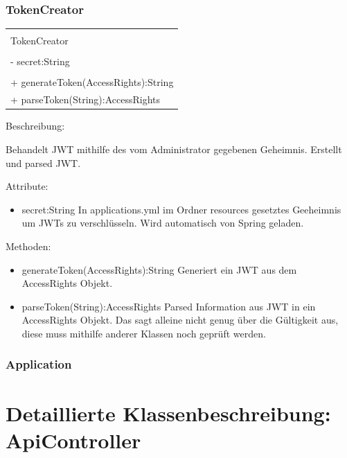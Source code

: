 \documentclass[a4paper,20pt,oneside]{book}
\begin{document}
	\subsubsection{TokenCreator}
\centering
	\begin{tabular}{|l|}
	\hline \\
	TokenCreator \\ \hline \\
	- secret:String\\
	
	\hline \\
	+ generateToken(AccessRights):String\\ 
+ parseToken(String):AccessRights	
 \\ \hline
	\end{tabular}
		 
	\vspace{0.5cm}
	\raggedright
	Beschreibung:
	
	Behandelt JWT mithilfe des vom Administrator gegebenen Geheimnis. Erstellt und parsed JWT.
	
	\vspace{0.5cm}
	Attribute:
	\begin{itemize}
	\item secret:String\linebreak
	In applications.yml im Ordner resources gesetztes Geeheimnis um JWTs zu verschlüsseln. Wird automatisch von Spring geladen.
	\end{itemize}
	
	Methoden:
	\begin{itemize}
	\item generateToken(AccessRights):String\linebreak
	Generiert ein JWT aus dem AccessRights Objekt.
	\item parseToken(String):AccessRights	
	Parsed Information aus JWT in ein AccessRights Objekt. Das sagt alleine nicht genug über die Gültigkeit aus, diese muss mithilfe anderer Klassen noch geprüft werden.
	\end{itemize}
	
	\newpage

	
	
	\subsubsection{Application}

	\section{Detaillierte Klassenbeschreibung: ApiController}
\end{document}
